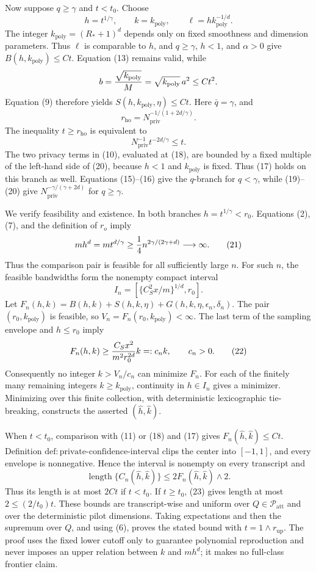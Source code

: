 Now suppose \(q\ge\gamma\) and \(t<t_0\).  Choose
\[
 h=t^{1/\gamma},\qquad k=k_{\mathrm{poly}},
 \qquad \ell=h k_{\mathrm{poly}}^{-1/d}.
\tag{18}
\]
The integer \(k_{\mathrm{poly}}=(R_*+1)^d\) depends only on fixed smoothness and dimension parameters.  Thus \(\ell\) is comparable to \(h\), and \(q\ge\gamma\), \(h<1\), and \(\alpha>0\) give \(B(h,k_{\mathrm{poly}})\le Ct\).  Equation (13) remains valid, while
\[
 b={\sqrt{k_{\mathrm{poly}}}\over M}
 =\sqrt{k_{\mathrm{poly}}}\,a^2\le Ct^2.
\]
Equation (9) therefore yields \(S(h,k_{\mathrm{poly}},\eta)\le Ct\).  Here \(\bar q=\gamma\), and
\[
 r_{\mathrm{ho}}=N_{\mathrm{priv}}^{-1/(1+2d/\gamma)}.
\tag{19}
\]
The inequality \(t\ge r_{\mathrm{ho}}\) is equivalent to
\[
 N_{\mathrm{priv}}^{-1}t^{-2d/\gamma}\le t.
\tag{20}
\]
The two privacy terms in (10), evaluated at (18), are bounded by a fixed multiple of the left-hand side of (20), because \(h<1\) and \(k_{\mathrm{poly}}\) is fixed.  Thus (17) holds on this branch as well.  Equations (15)--(16) give the \(q\)-branch for \(q<\gamma\), while (19)--(20) give \(N_{\mathrm{priv}}^{-\gamma/(\gamma+2d)}\) for \(q\ge\gamma\).

We verify feasibility and existence.  In both branches \(h=t^{1/\gamma}<r_0\).  Equations (2), (7), and the definition of \(r_o\) imply
\[
 mh^d=mt^{d/\gamma}
 \ge{1\over4}n^{2\gamma/(2\gamma+d)}\longrightarrow\infty.
\tag{21}
\]
Thus the comparison pair is feasible for all sufficiently large \(n\).  For such \(n\), the feasible bandwidths form the nonempty compact interval
\[
 I_n=[\{C_S^2x/m\}^{1/d},r_0].
\]
Let \(F_n(h,k)=B(h,k)+S(h,k,\eta)+G(h,k,\eta,\epsilon_n,\delta_n)\).  The pair \((r_0,k_{\mathrm{poly}})\) is feasible, so \(V_n=F_n(r_0,k_{\mathrm{poly}})<\infty\).  The last term of the sampling envelope and \(h\le r_0\) imply
\[
 F_n(h,k)\ge {C_Sx^2\over m^2r_0^{2d}}k=:c_nk,
 \qquad c_n>0.
\tag{22}
\]
Consequently no integer \(k>V_n/c_n\) can minimize \(F_n\).  For each of the finitely many remaining integers \(k\ge k_{\mathrm{poly}}\), continuity in \(h\in I_n\) gives a minimizer.  Minimizing over this finite collection, with deterministic lexicographic tie-breaking, constructs the asserted \((\widehat h,\widehat k)\).

When \(t<t_0\), comparison with (11) or (18) and (17) gives \(F_n(\widehat h,\widehat k)\le Ct\).  Definition \(\mathrm{def{:}private\text{-}confidence\text{-}interval}\) clips the center into \([-1,1]\), and every envelope is nonnegative.  Hence the interval is nonempty on every transcript and
\[
 \operatorname{length}\{C_n(\widehat h,\widehat k)\}
 \le2F_n(\widehat h,\widehat k)\wedge2.
\tag{23}
\]
Thus its length is at most \(2Ct\) if \(t<t_0\).  If \(t\ge t_0\), (23) gives length at most \(2\le(2/t_0)t\).  These bounds are transcript-wise and uniform over \(Q\in\mathcal P_{\mathrm{att}}\) and over the deterministic pilot dimensions.  Taking expectations and then the supremum over \(Q\), and using (6), proves the stated bound with \(t=1\wedge r_{\mathrm{up}}\).  The proof uses the fixed lower cutoff only to guarantee polynomial reproduction and never imposes an upper relation between \(k\) and \(mh^d\); it makes no full-class frontier claim.

